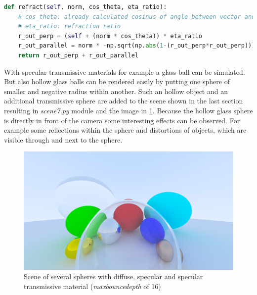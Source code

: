 \documentclass[]{article}
\begin{document}
		\begin{lstlisting}[caption={Method for refracting a vector on a normal vector}, language=Python, label=lst:refract]
def refract(self, norm, cos_theta, eta_ratio):
	# cos_theta: already calculated cosinus of angle between vector and normal
	# eta_ratio: refraction ratio
	r_out_perp = (self + (norm * cos_theta)) * eta_ratio
	r_out_parallel = norm * -np.sqrt(np.abs(1-(r_out_perp*r_out_perp)))
	return r_out_perp + r_out_parallel			
		\end{lstlisting}
	
		With specular transmissive materials for example a glass ball can be simulated. But also hollow glass balls can be rendered easily by putting one sphere of smaller and negative radius within another. Such an hollow object and an additional transmissive sphere are added to the scene shown in the last section resulting in \emph{scene7.py} module and the image in \cref{fig:image7}. Because the hollow glass sphere is directly in front of the camera some interesting effects can be observed. For example some reflections within the sphere and distortions of objects, which are visible through and next to the sphere.
		
		\begin{figure}[h]
			\centering
			\includegraphics[width=0.9\linewidth]{image7-5}
			\caption{Scene of several spheres with diffuse, specular and specular transmissive material (\emph{max\textunderscore bounce\textunderscore depth} of 16)}
			\label{fig:image7}
		\end{figure}
				   
\end{document}
